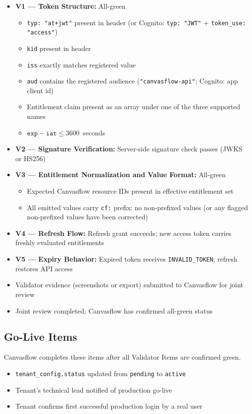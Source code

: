 \begin{itemize}[label=$\square$, leftmargin=2em]
  \item \textbf{V1 --- Token Structure:} All-green
    \begin{itemize}[label=$\square$, leftmargin=2em]
      \item \texttt{typ: "at+jwt"} present in header (or Cognito: \texttt{typ: "JWT"} +
        \texttt{token\_use: "access"})
      \item \texttt{kid} present in header
      \item \texttt{iss} exactly matches registered value
      \item \texttt{aud} contains the registered audience (\texttt{"canvasflow-api"}; Cognito: app client id)
      \item Entitlement claim present as an array under one of the three supported names
      \item $\texttt{exp} - \texttt{iat} \leq 3600$~seconds
    \end{itemize}
  \item \textbf{V2 --- Signature Verification:} Server-side signature check passes (JWKS
    or HS256)
  \item \textbf{V3 --- Entitlement Normalization and Value Format:} All-green
    \begin{itemize}[label=$\square$, leftmargin=2em]
      \item Expected Canvasflow resource IDs present in effective entitlement set
      \item All emitted values carry \texttt{cf:} prefix; no non-prefixed values (or any
        flagged non-prefixed values have been corrected)
    \end{itemize}
  \item \textbf{V4 --- Refresh Flow:} Refresh grant succeeds; new access token carries
    freshly evaluated entitlements
  \item \textbf{V5 --- Expiry Behavior:} Expired token receives \texttt{INVALID\_TOKEN};
    refresh restores API access
  \item Validator evidence (screenshots or export) submitted to Canvasflow for joint
    review
  \item Joint review completed; Canvasflow has confirmed all-green status
\end{itemize}

\subsection*{Go-Live Items}

\begin{notebox}
Canvasflow completes these items after all Validator Items are confirmed green.
\end{notebox}

\begin{itemize}[label=$\square$, leftmargin=2em]
  \item \texttt{tenant\_config.status} updated from \texttt{pending} to \texttt{active}
  \item Tenant's technical lead notified of production go-live
  \item Tenant confirms first successful production login by a real user
\end{itemize}
